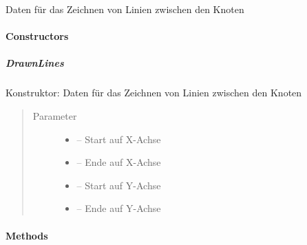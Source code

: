 \documentclass[letterpaper,10pt,ngerman]{sphinxmanual}
\begin{document}
\begin{fulllineitems}
\label{\detokenize{com/linuxluigi/edu/data/DrawnLines:com.linuxluigi.edu.data.DrawnLines}}
Daten für das Zeichnen von Linien zwischen den Knoten

\end{fulllineitems}



\paragraph{Constructors}
\label{\detokenize{com/linuxluigi/edu/data/DrawnLines:constructors}}

\subparagraph{DrawnLines}
\label{\detokenize{com/linuxluigi/edu/data/DrawnLines:id1}}

\begin{fulllineitems}
\label{\detokenize{com/linuxluigi/edu/data/DrawnLines:com.linuxluigi.edu.data.DrawnLines.DrawnLines(int, int, int, int)}}
Konstruktor: Daten für das Zeichnen von Linien zwischen den Knoten
\begin{quote}\begin{description}
\item[{Parameter}] \leavevmode\begin{itemize}
\item {} 
 -- Start auf X-Achse

\item {} 
 -- Ende auf X-Achse

\item {} 
 -- Start auf Y-Achse

\item {} 
 -- Ende auf Y-Achse

\end{itemize}

\end{description}\end{quote}

\end{fulllineitems}



\paragraph{Methods}
\label{\detokenize{com/linuxluigi/edu/data/DrawnLines:methods}}
\end{document}
